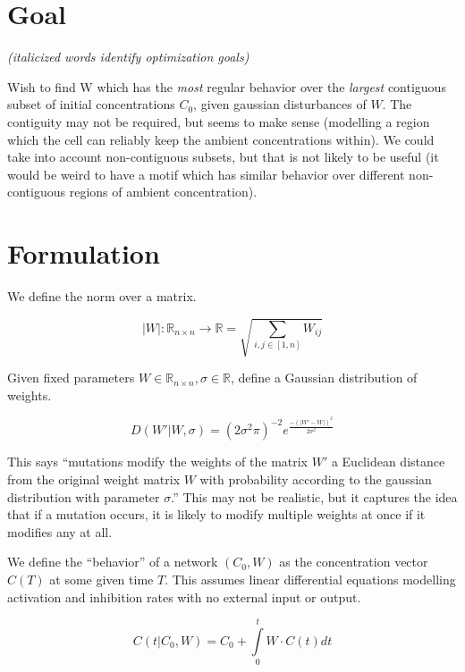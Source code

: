 \documentclass[10pt]{article}
\begin{document}
\section*{Goal}
\textit{(italicized words identify optimization goals)}

Wish to find W which has the \textit{most} regular behavior over the \textit{largest} contiguous subset of initial concentrations $C_0$, given gaussian disturbances of $W$. The contiguity may not be required, but seems to make sense (modelling a region which the cell can reliably keep the ambient concentrations within). We could take into account non-contiguous subsets, but that is not likely to be useful (it would be weird to have a motif which has similar behavior over different non-contiguous regions of ambient concentration).

\section*{Formulation}
We define the norm over a matrix.

\begin{equation}
\lvert W \rvert: \mathbb{R}_{n \times n} \to \mathbb{R} = \sqrt{\sum\limits_{i, j \in [1,n]} W_{ij}}
\end{equation}

Given fixed parameters $W \in \mathbb{R}_{n \times n}, \sigma \in \mathbb{R}$, define a Gaussian distribution of weights.

\begin{equation}
  D(W'|W,\sigma) = (2 \sigma^2 \pi)^{-2} e^\frac{-(\lvert W' - W \rvert)^2}{2 \sigma^2}
\end{equation}

This says ``mutations modify the weights of the matrix $W'$ a Euclidean distance from the original weight matrix $W$ with probability according to the gaussian distribution with parameter $\sigma$.'' This may not be realistic, but it captures the idea that if a mutation occurs, it is likely to modify multiple weights at once if it modifies any at all.

We define the ``behavior'' of a network $(C_0, W)$ as the concentration vector $C(T)$ at some given time $T$. This assumes linear differential equations modelling activation and inhibition rates with no external input or output.

\begin{equation}
  C(t|C_0, W) = C_0 + \int\limits_0^t W \cdot C(t) dt
\end{equation}
\end{document}
